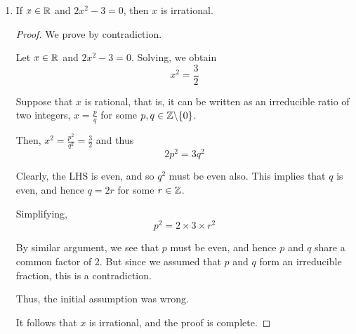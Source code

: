 \begin{enumerate}
\begin{proof}
        Hence, if the theorem is true for $n=k$ for some $k \in \Z^+$,
        then it is also true for $n=k+1$.

        Therefore, the theorem is proved for all positive integers $n$,
        by induction, and the proof is complete.
    \end{proof}

\item
    \begin{theorem}
        If $x \in \mathbb{R}$ and $2x^2 - 3 = 0$, then $x$ is irrational.
    \end{theorem}
    \begin{proof}
        We prove by contradiction.

        Let $x \in \mathbb{R}$ and $2x^2 - 3 = 0$.
        Solving, we obtain
        $$x^2 = \frac{3}{2}$$

        Suppose that $x$ is rational, that is, it can be written as an
        irreducible ratio of two integers, $x = \frac{p}{q}$ for some
        $p, q \in \mathbb{Z} \backslash \{0\}$.

        Then, $x^2 = \frac{p^2}{q^2} = \frac{3}{2}$ and thus
        $$2p^2 = 3q^2$$

        Clearly, the LHS is even, and so $q^2$ must be even also.
        This implies that $q$ is even, and hence $q = 2r$ for some
        $r \in \mathbb{Z}$.

        Simplifying,
        $$p^2 = 2 \times 3 \times r^2$$

        By similar argument, we see that $p$ must be even, and hence
        $p$ and $q$ share a common factor of 2.
        But since we assumed that $p$ and $q$ form an irreducible
        fraction, this is a contradiction.

        Thus, the initial assumption was wrong.

        It follows that $x$ is irrational, and the proof is complete.
    \end{proof}
\end{enumerate}
